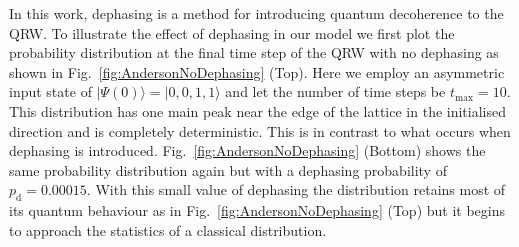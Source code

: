 \documentclass[aps,pra,twocolumn,amsmath,amssymb,nofootinbib,superscriptaddress]{revtex4}
\newcommand{\ket}[1]{|#1\rangle}
\begin{document}
 In this work, dephasing is a method for introducing quantum decoherence to the QRW. To illustrate the effect of dephasing in our model we first plot the probability distribution at the final time step of the QRW with no dephasing as shown in Fig.~\ref{fig:AndersonNoDephasing} (Top). Here we employ an asymmetric input state of $\ket{\Psi(0)}=\ket{0,0,1,1}$ and let the number of time steps be $t_\mathrm{max}=10$. This distribution has one main peak near the edge of the lattice in the initialised direction and is completely deterministic. This is in contrast to what occurs when dephasing is introduced. Fig.~\ref{fig:AndersonNoDephasing} (Bottom) shows the same probability distribution again but with a dephasing probability of $p_{\mathrm{d}}=0.00015$. With this small value of dephasing the distribution retains most of its quantum behaviour as in Fig.~\ref{fig:AndersonNoDephasing} (Top) but it begins to approach the statistics of a classical distribution.
\end{document}
